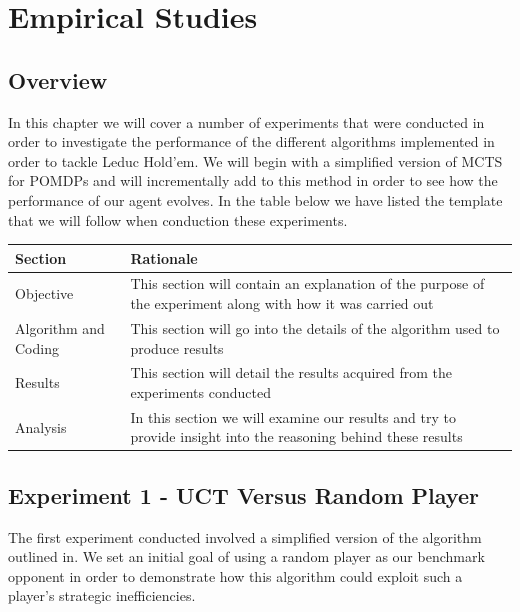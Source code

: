 
\chapter{Empirical Studies}\label{ch:empirical}

\section{Overview}\label{sec:empOverview}
In this chapter we will cover a number of experiments that were conducted in order to investigate
the performance of the different algorithms implemented in order to tackle Leduc Hold'em.
We will begin with a simplified version of MCTS for POMDPs and will incrementally add to this
method in order to see how the performance of our agent evolves.
In the table below we have listed the template that we will follow when conduction these experiments.

\begin{tabular}{ | p{2cm} | p{10cm} | }
    \hline
    \textbf{Section} & \textbf{Rationale} \\
    \hline
    Objective & This section will contain an explanation of the purpose of the experiment along with
    how it was carried out \\
    \hline
    Algorithm and Coding & This section will go into the details of the algorithm used to produce results \\
    \hline
    Results & This section will detail the results acquired from the experiments conducted \\
    \hline
    Analysis & In this section we will examine our results and try to provide insight into the
    reasoning behind these results \\
    \hline
\end{tabular}

\section{Experiment 1 - UCT Versus Random Player}\label{sec:expmeriment1}
The first experiment conducted involved a simplified version of the algorithm outlined in\citep{silver2010monte}.
We set an initial goal of using a random player as our benchmark opponent in order to demonstrate how
this algorithm could exploit such a player's strategic inefficiencies.


